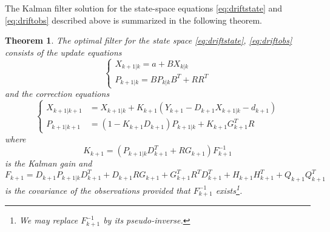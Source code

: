 \documentclass{article}
\newtheorem{thm}{Theorem}[section]
\theoremstyle{definition}
\theoremstyle{remark}
\begin{document}
The Kalman filter solution for the state-space equations \eqref{eq:driftstate} and \eqref{eq:driftobs} described above is summarized in the following theorem.

\begin{thm}\label{thm:driftKal}
The optimal filter for the state space \eqref{eq:driftstate}, \eqref{eq:driftobs} consists of the \emph{update equations}
\begin{equation}
\left\{ \begin{array}{ll}
			X_{k+1|k}=a+BX_{k|k}\\
			P_{k+1|k}=BP_{k|k}B^T+RR^T
        \end{array} \right. 
\end{equation}
and the \emph{correction equations}
\begin{equation}
\left\{ \begin{array}{ll}
			X_{k+1|k+1}&=X_{k+1|k}+K_{k+1}(Y_{k+1}-D_{k+1}X_{k+1|k}-d_{k+1})\\
			P_{k+1|k+1}&=(1-K_{k+1}D_{k+1})P_{k+1|k}+K_{k+1}G^T_{k+1}R
        \end{array} \right. 
\end{equation}
where
\begin{equation}
			K_{k+1}=(P_{k+1|k}D^T_{k+1}+RG_{k+1})F^{-1}_{k+1}
\end{equation}
is the Kalman gain and			
\begin{equation}
F_{k+1}=D_{k+1}P_{k+1|k}D_{k+1}^T+D_{k+1}RG_{k+1}+G_{k+1}^TR^TD_{k+1}^T+H_{k+1}H_{k+1}^T+Q_{k+1}Q_{k+1}^T
\end{equation}
is the covariance of the observations provided that $F^{-1}_{k+1}$ exists\footnote{We may replace $F^{-1}_{k+1}$ by its pseudo-inverse.}.
\end{thm}
\end{document}

